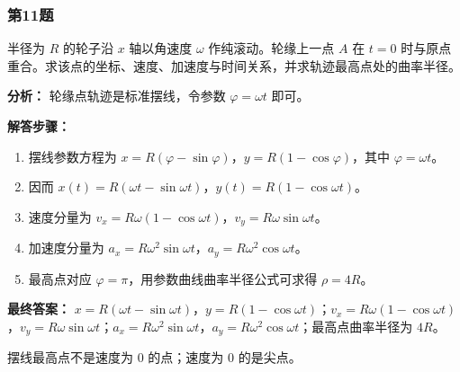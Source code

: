 \documentclass[12pt,a4paper]{ctexart}
\begin{document}
\subsubsection*{第11题}
\begin{tcolorbox}[colback=gray!2!white,colframe=black!60,title={题目}]
半径为 \(R\) 的轮子沿 \(x\) 轴以角速度 \(\omega\) 作纯滚动。轮缘上一点 \(A\) 在 \(t=0\) 时与原点重合。求该点的坐标、速度、加速度与时间关系，并求轨迹最高点处的曲率半径。\par
\end{tcolorbox}
\begin{tcolorbox}[colback=blue!2!white,colframe=blue!55!black,title={完整答案}]
\textbf{分析：}
轮缘点轨迹是标准摆线，令参数 \(\varphi=\omega t\) 即可。\par
\textbf{解答步骤：}
\begin{enumerate}
\item 摆线参数方程为 \(x=R(\varphi-\sin\varphi)\)，\(y=R(1-\cos\varphi)\)，其中 \(\varphi=\omega t\)。
\item 因而 \(x(t)=R(\omega t-\sin\omega t)\)，\(y(t)=R(1-\cos\omega t)\)。
\item 速度分量为 \(v_x=R\omega(1-\cos\omega t)\)，\(v_y=R\omega\sin\omega t\)。
\item 加速度分量为 \(a_x=R\omega^2\sin\omega t\)，\(a_y=R\omega^2\cos\omega t\)。
\item 最高点对应 \(\varphi=\pi\)，用参数曲线曲率半径公式可求得 \(\rho=4R\)。
\end{enumerate}
\textbf{最终答案：}
\(x=R(\omega t-\sin\omega t)\)，\(y=R(1-\cos\omega t)\)；\(v_x=R\omega(1-\cos\omega t)\)，\(v_y=R\omega\sin\omega t\)；\(a_x=R\omega^2\sin\omega t\)，\(a_y=R\omega^2\cos\omega t\)；最高点曲率半径为 \(4R\)。\par
\end{tcolorbox}
\begin{tcolorbox}[colback=red!2!white,colframe=red!55!black,title={易错点}]
摆线最高点不是速度为 0 的点；速度为 0 的是尖点。\par
\end{tcolorbox}
\end{document}
